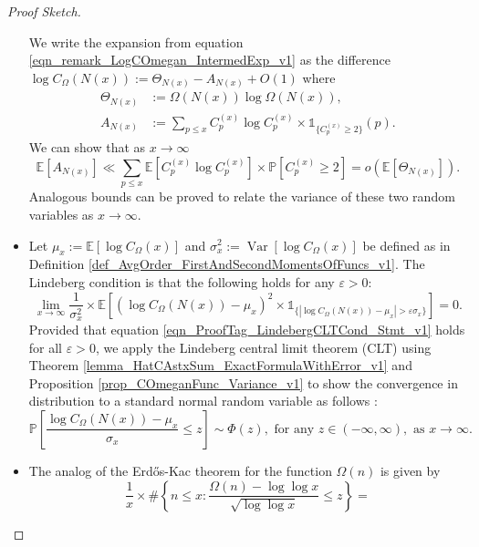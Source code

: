 \documentclass[11pt,reqno,a4letter]{article}
\newcommand{\hlocalref}[1]{\hyperref[#1]{\ref{#1}}}
\numberwithin{equation}{section}
\numberwithin{figure}{section}
\numberwithin{table}{section}
\theoremstyle{plain}
\numberwithin{theorem}{section}
\theoremstyle{definition}
\begin{document}
\begin{proof}[Proof Sketch]
\begin{itemize}[noitemsep,topsep=0pt,leftmargin=0.23in]
We write the expansion from equation 
\eqref{eqn_remark_LogCOmegan_IntermedExp_v1} as the difference 
$\log C_{\Omega}(N(x)) := \Theta_{N(x)} - A_{N(x)} + O(1)$ where 
\begin{align*}
\Theta_{N(x)} & := \Omega(N(x)) \log \Omega(N(x)), \\ 
A_{N(x)} & := \sum_{p \leq x} C_p^{(x)} \log C_p^{(x)} \times \mathds{1}_{\{C_p^{(x)} \geq 2\}}(p). 
\end{align*}
We can show that as $x \rightarrow \infty$ 
\[
\mathbb{E}[A_{N(x)}] \ll \sum_{p \leq x} \mathbb{E}\left[C_p^{(x)} \log C_p^{(x)}\right] 
     \times \mathbb{P}\left[C_p^{(x)} \geq 2\right] = o\left(\mathbb{E}[\Theta_{N(x)}]\right). 
\]
Analogous bounds can be proved to relate the variance of these 
two random variables as $x \rightarrow \infty$. 
\item 
Let $\mu_x := \mathbb{E}\left[\log C_{\Omega}(x)\right]$ and 
$\sigma_x^2 := \operatorname{Var}\left[\log C_{\Omega}(x)\right]$ be defined as in 
Definition \hlocalref{def_AvgOrder_FirstAndSecondMomentsOfFuncs_v1}. 
The Lindeberg condition is that the following 
holds for any $\varepsilon > 0$: 
\begin{equation}
\label{eqn_ProofTag_LindebergCLTCond_Stmt_v1}
\lim_{x \rightarrow \infty} \frac{1}{\sigma_x^2} \times 
     \mathbb{E}\left[\left(\log C_{\Omega}(N(x)) - \mu_x\right)^2 
     \times 
     \mathds{1}_{\{\left\lvert \log C_{\Omega}(N(x)) - \mu_x \right\rvert > 
     \varepsilon \sigma_x\}}\right] = 0. 
\end{equation}
Provided that 
equation \eqref{eqn_ProofTag_LindebergCLTCond_Stmt_v1} holds for all $\varepsilon > 0$, 
we apply the Lindeberg central limit theorem (CLT) using 
Theorem \hlocalref{lemma_HatCAstxSum_ExactFormulaWithError_v1} and 
Proposition \hlocalref{prop_COmeganFunc_Variance_v1} to show the 
convergence in distribution to a standard normal random variable as follows 
\cite[\S 27]{BILLINGSLY-PROB-AND-MEASURE-BOOK}: 
\begin{equation}
\label{eqn_ProofTag_LindebergCLT_Conclusion_Stmt_v2}
\mathbb{P}\left[\frac{\log C_{\Omega}(N(x)) - \mu_x}{\sigma_x} \leq z\right] \sim 
	\Phi\left(z\right), \text{ for any } z \in (-\infty, \infty), 
	\text{ as } x \rightarrow \infty.
\end{equation}
\item 
The analog of the Erd\H{o}s-Kac theorem for the function $\Omega(n)$ is given by 
\cite[Thm.~7.21; \S 7.4]{MV} 
\[
\frac{1}{x} \times \#\left\{n \leq x: \frac{\Omega(n) - \log\log x}{\sqrt{\log\log x}} \leq z\right\} = 
\]
\end{itemize}
\end{proof}
\end{document}
